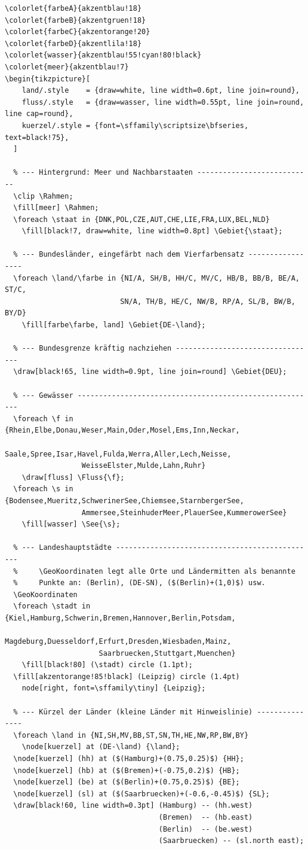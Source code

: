 \begin{lstlisting}[style=latex]
% Präambel: 
\colorlet{farbeA}{akzentblau!18}
\colorlet{farbeB}{akzentgruen!18}
\colorlet{farbeC}{akzentorange!20}
\colorlet{farbeD}{akzentlila!18}
\colorlet{wasser}{akzentblau!55!cyan!80!black}
\colorlet{meer}{akzentblau!7}
\begin{tikzpicture}[
    land/.style    = {draw=white, line width=0.6pt, line join=round},
    fluss/.style   = {draw=wasser, line width=0.55pt, line join=round, line cap=round},
    kuerzel/.style = {font=\sffamily\scriptsize\bfseries, text=black!75},
  ]

  % --- Hintergrund: Meer und Nachbarstaaten ---------------------------
  \clip \Rahmen;
  \fill[meer] \Rahmen;
  \foreach \staat in {DNK,POL,CZE,AUT,CHE,LIE,FRA,LUX,BEL,NLD}
    \fill[black!7, draw=white, line width=0.8pt] \Gebiet{\staat};

  % --- Bundesländer, eingefärbt nach dem Vierfarbensatz -----------------
  \foreach \land/\farbe in {NI/A, SH/B, HH/C, MV/C, HB/B, BB/B, BE/A, ST/C,
                           SN/A, TH/B, HE/C, NW/B, RP/A, SL/B, BW/B, BY/D}
    \fill[farbe\farbe, land] \Gebiet{DE-\land};

  % --- Bundesgrenze kräftig nachziehen ---------------------------------
  \draw[black!65, line width=0.9pt, line join=round] \Gebiet{DEU};

  % --- Gewässer --------------------------------------------------------
  \foreach \f in {Rhein,Elbe,Donau,Weser,Main,Oder,Mosel,Ems,Inn,Neckar,
                  Saale,Spree,Isar,Havel,Fulda,Werra,Aller,Lech,Neisse,
                  WeisseElster,Mulde,Lahn,Ruhr}
    \draw[fluss] \Fluss{\f};
  \foreach \s in {Bodensee,Mueritz,SchwerinerSee,Chiemsee,StarnbergerSee,
                  Ammersee,SteinhuderMeer,PlauerSee,KummerowerSee}
    \fill[wasser] \See{\s};

  % --- Landeshauptstädte -----------------------------------------------
  %     \GeoKoordinaten legt alle Orte und Ländermitten als benannte
  %     Punkte an: (Berlin), (DE-SN), ($(Berlin)+(1,0)$) usw.
  \GeoKoordinaten
  \foreach \stadt in {Kiel,Hamburg,Schwerin,Bremen,Hannover,Berlin,Potsdam,
                      Magdeburg,Duesseldorf,Erfurt,Dresden,Wiesbaden,Mainz,
                      Saarbruecken,Stuttgart,Muenchen}
    \fill[black!80] (\stadt) circle (1.1pt);
  \fill[akzentorange!85!black] (Leipzig) circle (1.4pt)
    node[right, font=\sffamily\tiny] {Leipzig};

  % --- Kürzel der Länder (kleine Länder mit Hinweislinie) ---------------
  \foreach \land in {NI,SH,MV,BB,ST,SN,TH,HE,NW,RP,BW,BY}
    \node[kuerzel] at (DE-\land) {\land};
  \node[kuerzel] (hh) at ($(Hamburg)+(0.75,0.25)$) {HH};
  \node[kuerzel] (hb) at ($(Bremen)+(-0.75,0.2)$) {HB};
  \node[kuerzel] (be) at ($(Berlin)+(0.75,0.25)$) {BE};
  \node[kuerzel] (sl) at ($(Saarbruecken)+(-0.6,-0.45)$) {SL};
  \draw[black!60, line width=0.3pt] (Hamburg) -- (hh.west)
                                    (Bremen)  -- (hb.east)
                                    (Berlin)  -- (be.west)
                                    (Saarbruecken) -- (sl.north east);


\end{lstlisting}
